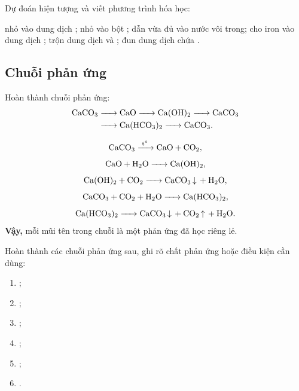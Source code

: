 \begin{tuluyen}
Dự đoán hiện tượng và viết phương trình hóa học:
\begin{tasks}
	\task nhỏ  vào dung dịch ;
	\task nhỏ  vào bột ;
	\task dẫn  vừa đủ vào nước vôi trong;
	\task cho iron vào dung dịch ;
	\task trộn dung dịch  và ;
	\task đun dung dịch chứa .
\end{tasks}
\end{tuluyen}

\subsection{Chuỗi phản ứng}

\begin{vidu}
Hoàn thành chuỗi phản ứng:
\[
\begin{aligned}
\ce{CaCO3} &\ce{-> CaO -> Ca(OH)2 -> CaCO3}\\
&\ce{-> Ca(HCO3)2 -> CaCO3}.
\end{aligned}
\]
\end{vidu}
\begin{loigiai}
\[
\ce{CaCO3 ->[t^\circ] CaO + CO2},
\]
\[
\ce{CaO + H2O -> Ca(OH)2},
\]
\[
\ce{Ca(OH)2 + CO2 -> CaCO3 v + H2O},
\]
\[
\ce{CaCO3 + CO2 + H2O -> Ca(HCO3)2},
\]
\[
\ce{Ca(HCO3)2 -> CaCO3 v + CO2 ^ + H2O}.
\]
\textbf{Vậy,} mỗi mũi tên trong chuỗi là một phản ứng đã học riêng lẻ.
\end{loigiai}

\begin{tuluyen}
Hoàn thành các chuỗi phản ứng sau, ghi rõ chất phản ứng hoặc điều kiện cần dùng:
\begin{enumerate}
\item {};
\item {};
\item {};
\item {};
\item {};
\item {}.
\end{enumerate}
\end{tuluyen}

